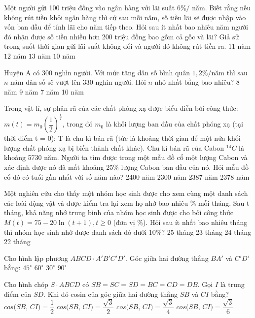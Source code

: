 \begin{ex}
Một người gửi 100 triệu đồng vào ngân hàng với lãi suất $6\%/$ năm. Biết rằng nếu không rút tiền khỏi ngân hàng thì cứ sau mỗi năm, số tiền lãi sẽ được nhập vào vốn ban đầu để tính lãi cho năm tiếp theo. Hỏi sau ít nhất bao nhiêu năm người đó nhận được số tiền nhiều hơn 200 triệu đồng bao gồm cả gốc và lãi? Giả sử trong suốt thời gian gửi lãi suất không đổi và người đó không rút tiền ra.
\choice
{$11$ năm}
{$12$ năm}
{$13$ năm}
{$10$ năm}
\end{ex}
\begin{ex}
Huyện A có $300$ nghìn người. Với mức tăng dân số bình quân $1{,}2\%$/năm thì sau $n$ năm dân số sẽ vượt lên $330$ nghìn người. Hỏi $n$ nhỏ nhất bằng bao nhiêu?
\choice
{8 năm}
{9 năm}
{7 năm}
{10 năm}
\end{ex}
\begin{ex}
Trong vật lí, sự phân rã của các chất phóng xạ được biểu diễn bởi công thức: $m(t)={{m_0\left(\dfrac{1}{2}\right)}^{\tfrac{t}{T}}}$, trong đó $m_0$ là khối lượng ban đầu của chất phóng xạ (tại thời điểm t = 0); T là chu kì bán rã (tức là khoảng thời gian để một nửa khối lượng chất phóng xạ bị biến thành chất khác). Chu kì bán rã của Cabon $^{14}C$ là khoảng 5730 năm. Người ta tìm được trong một mẫu đồ cổ một lượng Cabon và xác định được nó đã mất khoảng 25\% lượng Cabon ban đầu của nó. Hỏi mẫu đồ cổ đó có tuổi gần nhất với số năm nào?
\choice
{2400 năm}
{2300 năm}
{2387 năm}
{2378 năm}
\end{ex}
\begin{ex}
Một nghiên cứu cho thấy một nhóm học sinh được cho xem cùng một danh sách các loài động vật và được kiểm tra lại xem họ nhớ bao nhiêu \% mỗi tháng. Sau t tháng, khả năng nhớ trung bình của nhóm học sinh được cho bởi công thức $M(t)=75-20\ln (t+1),t\ge 0$ (đơn vị \%). Hỏi sau ít nhất bao nhiêu tháng thì nhóm học sinh nhớ được danh sách đó dưới 10\%?
\choice
{25 tháng}
{23 tháng}
{24 tháng}
{22 tháng}
\end{ex}
\begin{ex}
Cho hình lập phương $ABCD \cdot A'B'C'D'$. Góc giữa hai đường thẳng $BA'$ và $C'D'$ bằng: 
\choice
{$45^\circ $}
{$60^\circ $}
{$30^\circ $}
{$90^\circ $}
\end{ex}
\begin{ex}
Cho hình chóp $S \cdot ABCD$ có $SB=SC=SD=BC=CD=DB$. Gọi $I$ là trung điểm của $SD$. Khi đó cosin của góc giữa hai đường thẳng $SB$ và $CI$ bằng?
\choice
{$cos(SB$, $CI)=\dfrac{1}{2}$}
{$cos(SB$, $CI)=\dfrac{\sqrt{3}}{2}$}
{$cos(SB$, $CI)=\dfrac{\sqrt{3}}{4}$}
{$cos(SB$, $CI)=\dfrac{\sqrt{3}}{6}$}
\end{ex}
